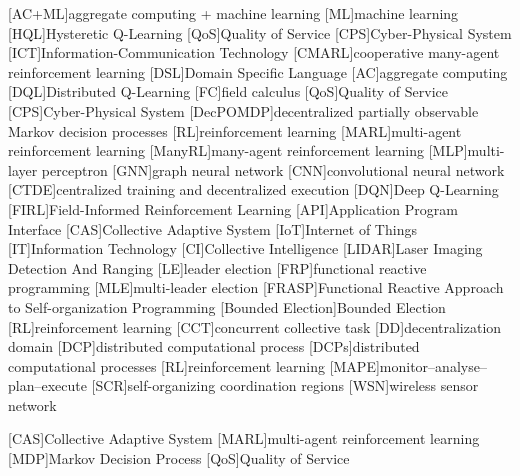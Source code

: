 [AC+ML]{aggregate computing + machine learning}
[ML]{machine learning}
[HQL]{Hysteretic Q-Learning}
[QoS]{Quality of Service}
[CPS]{Cyber-Physical System}
[ICT]{Information-Communication Technology}
[CMARL]{cooperative many-agent reinforcement learning}
[DSL]{Domain Specific Language}
[AC]{aggregate computing}
[DQL]{Distributed Q-Learning}
[FC]{field calculus}
[QoS]{Quality of Service}
[CPS]{Cyber-Physical System}
[DecPOMDP]{decentralized partially observable Markov decision processes}
[RL]{reinforcement learning}
[MARL]{multi-agent reinforcement learning}
[ManyRL]{many-agent reinforcement learning}
[MLP]{multi-layer perceptron}
[GNN]{graph neural network}
[CNN]{convolutional neural network}
[CTDE]{centralized training and decentralized execution}
[DQN]{Deep Q-Learning}
[FIRL]{Field-Informed Reinforcement Learning}
[API]{Application Program Interface}
[CAS]{Collective Adaptive System}
[IoT]{Internet of Things}
[IT]{Information Technology}
[CI]{Collective Intelligence}
[LIDAR]{Laser Imaging Detection And Ranging}
[LE]{leader election}
[FRP]{functional reactive programming}
[MLE]{multi-leader election}
[FRASP]{Functional Reactive Approach to Self-organization Programming}
[Bounded Election]{Bounded Election}
[RL]{reinforcement learning}
[CCT]{concurrent collective task}
[DD]{decentralization domain}
[DCP]{distributed computational process}
[DCPs]{distributed computational processes}
[RL]{reinforcement learning}
[MAPE]{monitor--analyse--plan--execute}
[SCR]{self-organizing coordination regions}
[WSN]{wireless sensor network}

[CAS]{Collective Adaptive System}
[MARL]{multi-agent reinforcement learning}
[MDP]{Markov Decision Process}
[QoS]{Quality of Service}